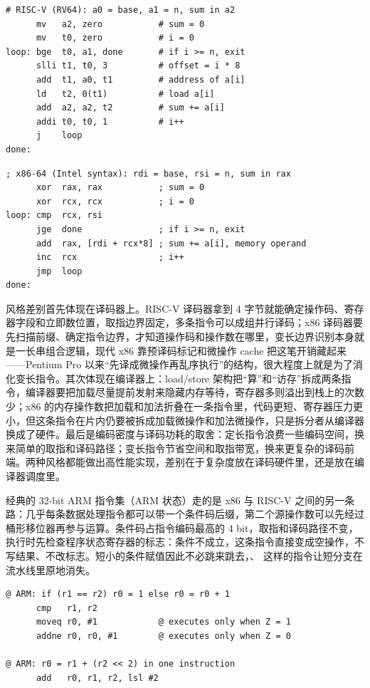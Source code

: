 \begin{lstlisting}
# RISC-V (RV64): a0 = base, a1 = n, sum in a2
      mv   a2, zero           # sum = 0
      mv   t0, zero           # i = 0
loop: bge  t0, a1, done       # if i >= n, exit
      slli t1, t0, 3          # offset = i * 8
      add  t1, a0, t1         # address of a[i]
      ld   t2, 0(t1)          # load a[i]
      add  a2, a2, t2         # sum += a[i]
      addi t0, t0, 1          # i++
      j    loop
done:
\end{lstlisting}

\begin{lstlisting}
; x86-64 (Intel syntax): rdi = base, rsi = n, sum in rax
      xor  rax, rax           ; sum = 0
      xor  rcx, rcx           ; i = 0
loop: cmp  rcx, rsi
      jge  done               ; if i >= n, exit
      add  rax, [rdi + rcx*8] ; sum += a[i], memory operand
      inc  rcx                ; i++
      jmp  loop
done:
\end{lstlisting}

风格差别首先体现在译码器上。RISC-V 译码器拿到 4 字节就能确定操作码、寄存器字段和立即数位置，取指边界固定，多条指令可以成组并行译码；x86 译码器要先扫描前缀、确定指令边界，才知道操作码和操作数在哪里，变长边界识别本身就是一长串组合逻辑，现代 x86 靠预译码标记和微操作 cache 把这笔开销藏起来——Pentium Pro 以来“先译成微操作再乱序执行”的结构，很大程度上就是为了消化变长指令。其次体现在编译器上：load/store 架构把“算”和“访存”拆成两条指令，编译器要把加载尽量提前发射来隐藏内存等待，寄存器多则溢出到栈上的次数少；x86 的内存操作数把加载和加法折叠在一条指令里，代码更短、寄存器压力更小，但这条指令在片内仍要被拆成加载微操作和加法微操作，只是拆分者从编译器换成了硬件。最后是编码密度与译码功耗的取舍：定长指令浪费一些编码空间，换来简单的取指和译码路径；变长指令节省空间和取指带宽，换来更复杂的译码前端。两种风格都能做出高性能实现，差别在于复杂度放在译码硬件里，还是放在编译器调度里。

经典的 32-bit ARM 指令集（ARM 状态）走的是 x86 与 RISC-V 之间的另一条路：几乎每条数据处理指令都可以带一个条件码后缀，第二个源操作数可以先经过桶形移位器再参与运算。条件码占指令编码最高的 4 bit，取指和译码路径不变，执行时先检查程序状态寄存器的标志：条件不成立，这条指令直接变成空操作，不写结果、不改标志。短小的条件赋值因此不必跳来跳去，、 这样的指令让短分支在流水线里原地消失。

\begin{lstlisting}
@ ARM: if (r1 == r2) r0 = 1 else r0 = r0 + 1
      cmp   r1, r2
      moveq r0, #1            @ executes only when Z = 1
      addne r0, r0, #1        @ executes only when Z = 0

@ ARM: r0 = r1 + (r2 << 2) in one instruction
      add   r0, r1, r2, lsl #2
\end{lstlisting}

